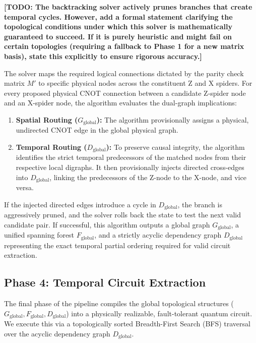 \documentclass[11pt]{article}
\theoremstyle{definition}
\begin{document}
\textbf{[TODO: The backtracking solver actively prunes branches that create temporal cycles. However, add a formal statement clarifying the topological conditions under which this solver is mathematically guaranteed to succeed. If it is purely heuristic and might fail on certain topologies (requiring a fallback to Phase 1 for a new matrix basis), state this explicitly to ensure rigorous accuracy.]}

The solver maps the required logical connections dictated by the parity check matrix $M'$ to specific physical nodes across the constituent Z and X spiders. For every proposed physical CNOT connection between a candidate Z-spider node and an X-spider node, the algorithm evaluates the dual-graph implications:

\begin{enumerate}
    \item \textbf{Spatial Routing ($G_{\text{global}}$):} The algorithm provisionally assigns a physical, undirected CNOT edge in the global physical graph.
    \item \textbf{Temporal Routing ($D_{\text{global}}$):} To preserve causal integrity, the algorithm identifies the strict temporal predecessors of the matched nodes from their respective local digraphs. It then provisionally injects directed cross-edges into $D_{\text{global}}$, linking the predecessors of the Z-node to the X-node, and vice versa.
\end{enumerate}

If the injected directed edges introduce a cycle in $D_{\text{global}}$, the branch is aggressively pruned, and the solver rolls back the state to test the next valid candidate pair. If successful, this algorithm outputs a global graph $G_{\text{global}}$, a unified spanning forest $F_{\text{global}}$, and a strictly acyclic dependency graph $D_{\text{global}}$ representing the exact temporal partial ordering required for valid circuit extraction.

\subsection{Phase 4: Temporal Circuit Extraction}
The final phase of the pipeline compiles the global topological structures ($G_{\text{global}}, F_{\text{global}}, D_{\text{global}}$) into a physically realizable, fault-tolerant quantum circuit. We execute this via a topologically sorted Breadth-First Search (BFS) traversal over the acyclic dependency graph $D_{\text{global}}$.
\end{document}

